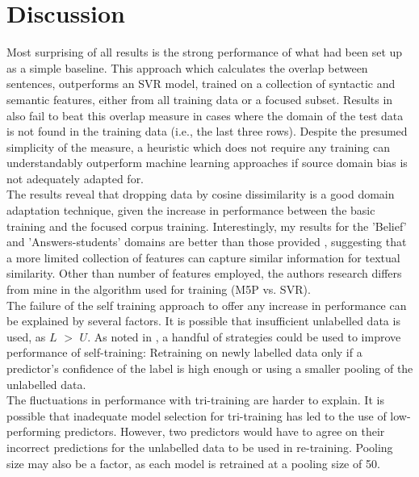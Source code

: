 \documentclass[11pt]{article}
\begin{document}
\section{Discussion}
Most surprising of all results is the strong performance of what had been set up as a simple baseline. This approach which calculates the overlap between sentences, outperforms an SVR model, trained on a collection of syntactic and semantic features, either from all training data or a focused subset. Results in \cite{arora2015dcu} also fail to beat this overlap measure in cases where the domain of the test data is not found in the training data (i.e., the last three rows). Despite the presumed simplicity of the measure, a heuristic which does not require any training can understandably outperform machine learning approaches if source domain bias is not adequately adapted for.\\

The results reveal that dropping data by cosine dissimilarity is a good domain adaptation technique, given the increase in performance between the basic training and the focused corpus training. Interestingly, my results for the 'Belief' and 'Answers-students' domains are better than those provided \cite{arora2015dcu}, suggesting that a more limited collection of features can capture similar information for textual similarity. Other than number of features employed, the authors research differs from mine in the algorithm used for training (M5P vs. SVR). \\

The failure of the self training approach to offer any increase in performance can be explained by several factors. It is possible that insufficient unlabelled data is used, as $L$ $>$ $U$. As noted in \cite{sogaard2013semi}, a handful of strategies could be used to improve performance of self-training: Retraining on newly labelled data only if a predictor's confidence of the label is high enough or using a smaller pooling of the unlabelled data.\\

The fluctuations in performance with tri-training are harder to explain. It is possible that inadequate model selection for tri-training has led to the use of low-performing predictors. However, two predictors would have to agree on their incorrect predictions for the unlabelled data to be used in re-training. Pooling size may also be a factor, as each model is retrained at a pooling size of 50. \\
\end{document}
